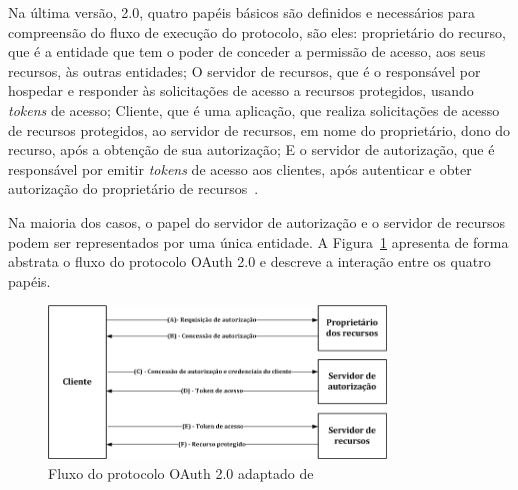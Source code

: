 Na última versão, 2.0, quatro papéis básicos são definidos e necessários para compreensão do fluxo de execução do protocolo, são eles: proprietário do recurso, que é a entidade que tem o poder de conceder a permissão de acesso, aos seus recursos, às outras entidades; O servidor de recursos, que é o responsável por hospedar e responder às solicitações de acesso a recursos protegidos, usando \emph{tokens} de acesso; Cliente, que é uma aplicação, que realiza solicitações de acesso de recursos protegidos, ao servidor de recursos, em nome do proprietário, dono do recurso, após a obtenção de sua autorização; E o servidor de autorização, que é responsável por emitir \emph{tokens} de acesso aos clientes, após autenticar e obter autorização do proprietário de recursos~\cite{rfc6749}.






Na maioria dos casos, o papel do servidor de autorização e o servidor de recursos podem  ser representados por uma única entidade. A Figura~\ref{fig:diagramaoauth} apresenta de forma abstrata o fluxo do protocolo OAuth 2.0 e descreve a interação entre os quatro papéis.

\begin{figure}[!htb]
\centering
\includegraphics[width=0.8\textwidth]{diagrama_oauth2.png}
\caption{Fluxo do protocolo OAuth 2.0 adaptado de~\cite{rfc6749}}
\label{fig:diagramaoauth}
\end{figure}

